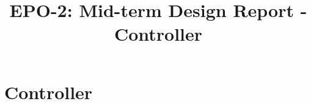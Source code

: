 \documentclass{report}
\title{EPO-2: Mid-term Design Report - Controller}
\author{}
\begin{document}
\chapter{Controller}
\label{ch:controller}
\end{document}
